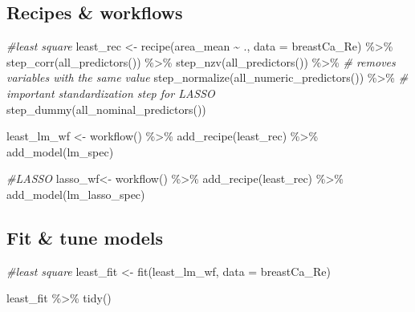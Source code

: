 \documentclass[
]{article}
\newenvironment{Shaded}{\begin{snugshade}}{\end{snugshade}}
\newcommand{\AttributeTok}[1]{\textcolor[rgb]{0.77,0.63,0.00}{#1}}
\newcommand{\CommentTok}[1]{\textcolor[rgb]{0.56,0.35,0.01}{\textit{#1}}}
\newcommand{\FunctionTok}[1]{\textcolor[rgb]{0.00,0.00,0.00}{#1}}
\newcommand{\NormalTok}[1]{#1}
\newcommand{\OtherTok}[1]{\textcolor[rgb]{0.56,0.35,0.01}{#1}}
\newcommand{\SpecialCharTok}[1]{\textcolor[rgb]{0.00,0.00,0.00}{#1}}
\begin{document}
\hypertarget{recipes-workflows}{%
\subsection{Recipes \& workflows}\label{recipes-workflows}}

\begin{Shaded}
\begin{Highlighting}[]
\CommentTok{\#least square}
\NormalTok{least\_rec }\OtherTok{\textless{}{-}} \FunctionTok{recipe}\NormalTok{(area\_mean }\SpecialCharTok{\textasciitilde{}}\NormalTok{ ., }\AttributeTok{data =}\NormalTok{ breastCa\_Re) }\SpecialCharTok{\%\textgreater{}\%}
    \FunctionTok{step\_corr}\NormalTok{(}\FunctionTok{all\_predictors}\NormalTok{()) }\SpecialCharTok{\%\textgreater{}\%} 
    \FunctionTok{step\_nzv}\NormalTok{(}\FunctionTok{all\_predictors}\NormalTok{()) }\SpecialCharTok{\%\textgreater{}\%} \CommentTok{\# removes variables with the same value}
    \FunctionTok{step\_normalize}\NormalTok{(}\FunctionTok{all\_numeric\_predictors}\NormalTok{()) }\SpecialCharTok{\%\textgreater{}\%} \CommentTok{\# important standardization step for LASSO}
    \FunctionTok{step\_dummy}\NormalTok{(}\FunctionTok{all\_nominal\_predictors}\NormalTok{())}

\NormalTok{least\_lm\_wf }\OtherTok{\textless{}{-}} \FunctionTok{workflow}\NormalTok{() }\SpecialCharTok{\%\textgreater{}\%}
    \FunctionTok{add\_recipe}\NormalTok{(least\_rec) }\SpecialCharTok{\%\textgreater{}\%}
    \FunctionTok{add\_model}\NormalTok{(lm\_spec)}
    
\CommentTok{\#LASSO}
\NormalTok{lasso\_wf}\OtherTok{\textless{}{-}} \FunctionTok{workflow}\NormalTok{() }\SpecialCharTok{\%\textgreater{}\%} 
  \FunctionTok{add\_recipe}\NormalTok{(least\_rec) }\SpecialCharTok{\%\textgreater{}\%}
  \FunctionTok{add\_model}\NormalTok{(lm\_lasso\_spec) }
\end{Highlighting}
\end{Shaded}

\hypertarget{fit-tune-models}{%
\subsection{Fit \& tune models}\label{fit-tune-models}}

\begin{Shaded}
\begin{Highlighting}[]
\CommentTok{\#least square}
\NormalTok{least\_fit }\OtherTok{\textless{}{-}} \FunctionTok{fit}\NormalTok{(least\_lm\_wf, }\AttributeTok{data =}\NormalTok{ breastCa\_Re) }

\NormalTok{least\_fit }\SpecialCharTok{\%\textgreater{}\%} \FunctionTok{tidy}\NormalTok{()}
\end{Highlighting}
\end{Shaded}
\end{document}
